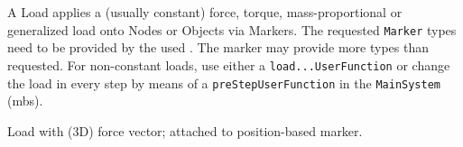 \ei

%

\newpage
A Load applies a (usually constant) force, torque, mass-proportional or generalized load onto Nodes or Objects via Markers. The requested \texttt{Marker} types need to be provided by the used . The marker may provide more types than requested. For non-constant loads, use either a \texttt{load...UserFunction} or change the load in every step by means of a \texttt{preStepUserFunction} in the \texttt{MainSystem} (mbs).


\label{sec:item:LoadForceVector}
Load with (3D) force vector; attached to position-based marker.
\vspace{12pt}\\

